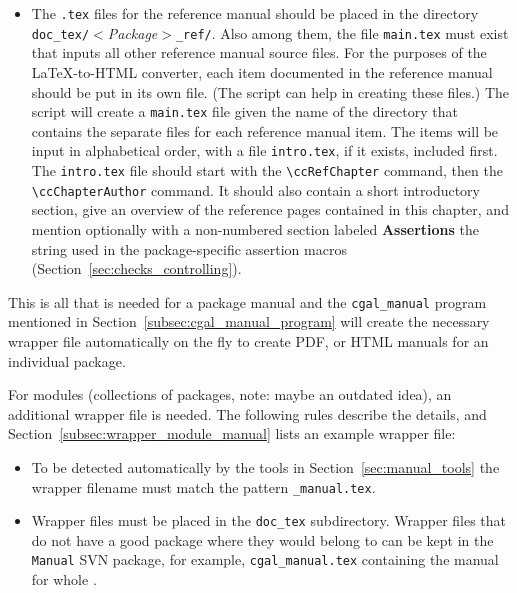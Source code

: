 \begin{itemize}
   \item The {\tt .tex} files for the reference manual should be placed in the
         directory \verb|doc_tex/|$<${\em Package}$>$\verb|_ref/|.
         Also among them, the file {\tt main.tex} must exist that
         inputs all other reference manual source files.
         For the purposes of the \LaTeX -to-HTML converter, each item
         documented in the reference manual should be put in its own file.
         (The script  can help
          in creating these files.)
         The script 
         will create a {\tt main.tex}%
         file given the name of the directory that contains the separate files
         for each
         reference manual item.  The items will be input in alphabetical order,
         with a file {\tt intro.tex}, if it
         exists, included first.  The {\tt intro.tex} file should
         start with the \verb|\ccRefChapter| command, then the
         \verb|\ccChapterAuthor| command. It should also
         contain a short introductory section, give an overview of the
         reference pages contained in this chapter, and mention
         optionally with a non-numbered section labeled \textbf{Assertions}
         the string used in the package-specific assertion macros
         (Section~\ref{sec:checks_controlling}).
\end{itemize}

This is all that is needed for a package manual and the
\texttt{cgal\_manual} program mentioned in
Section~\ref{subsec:cgal_manual_program} will create the necessary
wrapper file automatically on the fly to create PDF, or
HTML manuals for an individual package.

For modules (collections of packages, note: maybe an outdated idea),
an additional wrapper file is needed.
The following rules describe the details, and
Section~\ref{subsec:wrapper_module_manual} lists an example wrapper file:

\begin{itemize}
   \item To be detected automatically by the tools in
         Section~\ref{sec:manual_tools} the wrapper filename must
         match the pattern {\tt *\_manual.tex}.
   \item Wrapper files must be placed in the \texttt{doc\_tex}
         subdirectory. Wrapper files that do not have a good package
         where they would belong to can be kept in the \texttt{Manual}
         SVN package, for example, \texttt{cgal\_manual.tex}
         containing the manual for whole \cgal.
\end{itemize}

